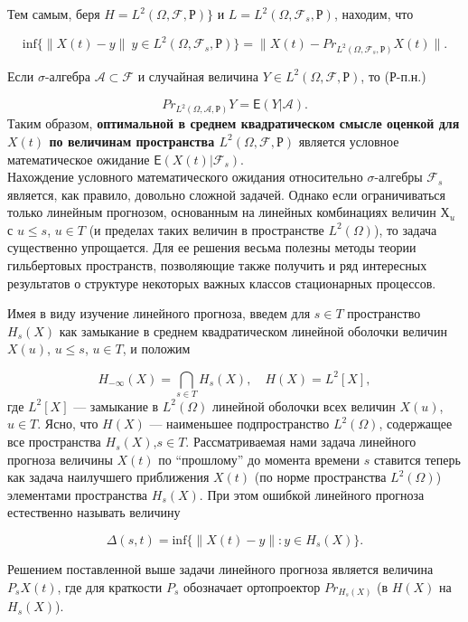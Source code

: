 Тем самым, беря $\textit{H} = L^2 (\Omega, \mathscr{F}, Р)\}$ и $L = L^2 (\Omega, \mathscr{F}_s, Р)$, находим, что

$$\mathrm{inf}\{\parallel  X(t)-y\parallel \:y\in L^2 (\Omega, \mathscr{F}_s, Р)\} = \parallel  X(t)-Pr_{L^2 (\Omega, \mathscr{F}_s, Р)}X(t)\parallel  .$$


Если $\sigma$-алгебра $\mathscr{A} \subset \mathscr{F}$ и случайная
величина $Y \in L^2 (\Omega, \mathscr{F}, Р)$, то (Р-п.н.)

$$Pr_{L^2 (\Omega, \mathscr{A}, Р)}Y = \mathsf{E}(Y|\mathscr{A}).$$
Таким образом, \textbf{оптимальной в среднем квадратическом смысле оценкой для $X (t)$ по
величинам пространства $L^2 (\Omega, \mathscr{F}, Р)$} является условное математическое ожидание
$\mathsf{E}(X(t)|\mathscr{F}_s)$.\\


Нахождение условного математического ожидания относительно $\sigma$-алгебры $\mathscr{F}_s$
является, как правило, довольно сложной задачей. Однако если ограничиваться
только линейным прогнозом, основанным на линейных комбинациях величин $Х_u$
с $u \leq s$, $u \in T$ (и пределах таких величин в пространстве $L^2(\Omega)$), то задача существенно упрощается. Для ее решения весьма полезны методы теории гильбертовых
пространств, позволяющие также получить и ряд интересных результатов о структуре некоторых важных классов стационарных процессов.


Имея в виду изучение линейного прогноза, введем для $s \in T$ пространство $H_s(X)$
как замыкание в среднем квадратическом линейной оболочки величин $X(u)$, $u \leq s$,
$u \in T$, и положим

$$H_{-\infty}(X) = \bigcap\limits_{s \in T} H_s(X), \quad  H(X) = L^2[X],$$
где $L^2[X]$ — замыкание в $L^2(\Omega)$ линейной оболочки всех величин $X(u)$, $u \in T$. Ясно, что $H(X)$ — наименьшее подпространство $L^2(\Omega)$, содержащее все пространства
$H_s(X)$,$s \in T$. Рассматриваемая нами задача линейного прогноза величины $X(t)$ по
“прошлому” до момента времени $s$ ставится теперь как задача наилучшего приближения $X(t)$ (по норме пространства $L^2(\Omega)$) элементами пространства $H_s(X)$. При
этом ошибкой линейного прогноза естественно называть величину

$$\Delta(s, t) = \mathrm{inf}\{\parallel  X(t)-y\parallel :y\in H_s(X)\}.$$


Решением поставленной выше задачи линейного прогноза является величина
$P_sX(t)$, где для краткости $P_s$ обозначает ортопроектор $Pr_{H_s(X)}$ (в $H(X)$ на $H_s(X)$).


